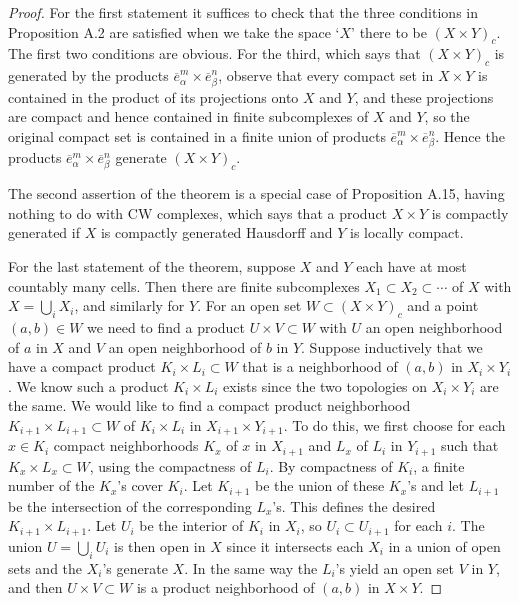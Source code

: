 \documentclass{article}
\theoremstyle{definition}
\begin{document}
\begin{proof}
For the first statement it suffices to check that the three conditions in Proposition A.2 are satisfied when we take the space `$X$' there to be $(X \times Y)_{c}$. The first two conditions are obvious. For the third, which says that $(X \times Y)_{c}$ is generated by the products $\overline{e}_{\alpha}^{m} \times \overline{e}_{\beta}^{n}$, observe that every compact set in $X \times Y$ is contained in the product of its projections onto $X$ and $Y$, and these projections are compact and hence contained in finite subcomplexes of $X$ and $Y$, so the original compact set is contained in a finite union of products $\overline{e}_{\alpha}^{m} \times \overline{e}_{\beta}^{n}$. Hence the products $\overline{e}_{\alpha}^{m} \times \overline{e}_{\beta}^{n}$ generate $(X \times Y)_{c}$.

The second assertion of the theorem is a special case of Proposition A.15, having nothing to do with CW complexes, which says that a product $X \times Y$ is compactly generated if $X$ is compactly generated Hausdorff and $Y$ is locally compact.

For the last statement of the theorem, suppose $X$ and $Y$ each have at most countably many cells. Then there are finite subcomplexes $X_1 \subset X_2 \subset \cdots$ of $X$ with $X = \bigcup_i X_i$, and similarly for $Y$. For an open set $W \subset (X \times Y)_c$ and a point $(a, b) \in W$ we need to find a product $U \times V \subset W$ with $U$ an open neighborhood of $a$ in $X$ and $V$ an open neighborhood of $b$ in $Y$. Suppose inductively that we have a compact product $K_i \times L_i \subset W$ that is a neighborhood of $(a, b)$ in $X_i \times Y_i$. We know such a product $K_i \times L_i$ exists since the two topologies on $X_i \times Y_i$ are the same. We would like to find a compact product neighborhood $K_{i+1} \times L_{i+1} \subset W$ of $K_i \times L_i$ in $X_{i+1} \times Y_{i+1}$. To do this, we first choose for each $x \in K_i$ compact neighborhoods $K_x$ of $x$ in $X_{i+1}$ and $L_x$ of $L_i$ in $Y_{i+1}$ such that $K_x \times L_x \subset W$, using the compactness of $L_i$. By compactness of $K_i$, a finite number of the $K_x$'s cover $K_i$. Let $K_{i+1}$ be the union of these $K_x$'s and let $L_{i+1}$ be the intersection of the corresponding $L_x$'s. This defines the desired $K_{i+1} \times L_{i+1}$. Let $U_i$ be the interior of $K_i$ in $X_i$, so $U_i \subset U_{i+1}$ for each $i$. The union $U = \bigcup_i U_i$ is then open in $X$ since it intersects each $X_i$ in a union of open sets and the $X_i$'s generate $X$. In the same way the $L_i$'s yield an open set $V$ in $Y$, and then $U \times V \subset W$ is a product neighborhood of $(a, b)$ in $X \times Y$.
\end{proof}
\end{document}
